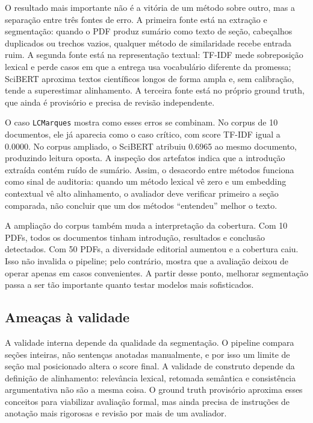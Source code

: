 \documentclass[12pt]{article}
\begin{document}
O resultado mais importante não é a vitória de um método sobre outro, mas a separação entre três fontes de erro. A primeira fonte está na extração e segmentação: quando o PDF produz sumário como texto de seção, cabeçalhos duplicados ou trechos vazios, qualquer método de similaridade recebe entrada ruim. A segunda fonte está na representação textual: TF-IDF mede sobreposição lexical e perde casos em que a entrega usa vocabulário diferente da promessa; SciBERT aproxima textos científicos longos de forma ampla e, sem calibração, tende a superestimar alinhamento. A terceira fonte está no próprio ground truth, que ainda é provisório e precisa de revisão independente.

O caso \texttt{LCMarques} mostra como esses erros se combinam. No corpus de 10 documentos, ele já aparecia como o caso crítico, com score TF-IDF igual a 0.0000. No corpus ampliado, o SciBERT atribuiu 0.6965 ao mesmo documento, produzindo leitura oposta. A inspeção dos artefatos indica que a introdução extraída contém ruído de sumário. Assim, o desacordo entre métodos funciona como sinal de auditoria: quando um método lexical vê zero e um embedding contextual vê alto alinhamento, o avaliador deve verificar primeiro a seção comparada, não concluir que um dos métodos ``entendeu'' melhor o texto.

A ampliação do corpus também muda a interpretação da cobertura. Com 10 PDFs, todos os documentos tinham introdução, resultados e conclusão detectados. Com 50 PDFs, a diversidade editorial aumentou e a cobertura caiu. Isso não invalida o pipeline; pelo contrário, mostra que a avaliação deixou de operar apenas em casos convenientes. A partir desse ponto, melhorar segmentação passa a ser tão importante quanto testar modelos mais sofisticados.

\subsection{Ameaças à validade}

A validade interna depende da qualidade da segmentação. O pipeline compara seções inteiras, não sentenças anotadas manualmente, e por isso um limite de seção mal posicionado altera o score final. A validade de construto depende da definição de alinhamento: relevância lexical, retomada semântica e consistência argumentativa não são a mesma coisa. O ground truth provisório aproxima esses conceitos para viabilizar avaliação formal, mas ainda precisa de instruções de anotação mais rigorosas e revisão por mais de um avaliador.
\end{document}
